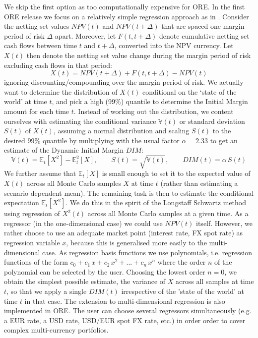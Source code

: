 \documentclass[12pt, a4paper]{article}
\newcommand\E{\ensuremath{\mathbb{E}}}
\newcommand\V{\ensuremath{\mathbb{V}}}
\newcommand{\NPV}{\mathit{NPV}}
\newcommand{\DIM}{\mathit{DIM}}
\begin{document}
\begin{appendix}
We skip the first option as too computationally expensive for ORE. In the first ORE release we focus on a relatively
simple regression approach as in \cite{Anfuso2016,LichtersEtAl}. Consider the netting set values $\NPV(t)$ and $\NPV(t+\Delta)$ that
are spaced one margin period of risk $\Delta$ apart. Moreover, let $F(t,t+\Delta)$ denote cumulative netting set cash
flows between time $t$ and $t+\Delta$, converted into the NPV currency. Let $X(t)$ then denote the netting set value
change during the margin period of risk excluding cash flows in that period:
$$
X(t) = \NPV(t+\Delta) + F(t, t+\Delta) - \NPV(t) 
$$  
ignoring discounting/compounding over the margin period of risk. We actually want to determine the distribution of
$X(t)$ conditional on the `state of the world' at time $t$, and pick a high (99\%) quantile to determine the Initial
Margin amount for each time $t$. Instead of working out the distribution, we content ourselves with estimating the
conditional variance $\V(t)$ or standard deviation $S(t)$ of $X(t)$, assuming a normal distribution and scaling $S(t)$
to the desired 99\% quantile by multiplying with the usual factor $\alpha=2.33$ to get an estimate of the Dynamic
Initial Margin $\DIM$:
$$
\V(t) = \E_t[X^2] - \E_t^2[X], \qquad S(t)=\sqrt{\V(t)}, \qquad \DIM(t) = \alpha \,S(t)
$$ 
We further assume that $\E_t[X]$ is small enough to set it to the expected value of $X(t)$ across all Monte Carlo
samples $X$ at time $t$ (rather than estimating a scenario dependent mean). The remaining task is then to estimate the
conditional expectation $\E_t[X^2]$. We do this in the spirit of the Longstaff Schwartz method using regression of
$X^2(t)$ across all Monte Carlo samples at a given time. As a regressor (in the one-dimensional case) we could use
$\NPV(t)$ itself. However, we rather choose to use an adequate market point (interest rate, FX spot rate) as regression
variable $x$, because this is generalised more easily to the multi-dimensional case. As regression basis functions we
use polynomials, i.e. regression functions of the form $c_0 + c_1\,x + c_2\,x^2 + ...+ c_n\,x^n$ where the order $n$ of
the polynomial can be selected by the user. Choosing the lowest order $n=0$, we obtain the simplest possible estimate,
the variance of $X$ across all samples at time $t$, so that we apply a single $\DIM(t)$ irrespective of the 'state of
the world' at time $t$ in that case.  The extension to multi-dimensional regression is also implemented in ORE. The user
can choose several regressors simultaneously (e.g. a EUR rate, a USD rate, USD/EUR spot FX rate, etc.) in order order to
cover complex multi-currency portfolios.


\end{appendix}
\end{document}

